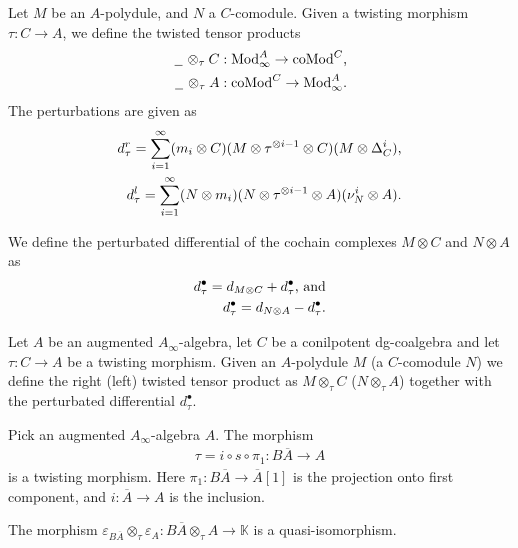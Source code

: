 \documentclass[../thesis.tex]{subfiles}
\begin{document}
            Let $M$ be an $A$-polydule, and $N$ a $C$-comodule. Given a twisting morphism $\tau : C \rightarrow A$, we define the twisted tensor products
            \begin{align*}
                \argument \otimes_\tau C & : \tt{Mod}_\infty^A \rightarrow \tt{coMod}^C\tt{,} \\
                \argument \otimes_\tau A & : \tt{coMod}^C \rightarrow \tt{Mod}_\infty^A\tt{.}
            \end{align*}
            The perturbations are given as
            \begin{align*}
                d_\tau^r = \sum_{i=1}^\infty (m_i \otimes C)(M \otimes \tau^{\otimes i-1} \otimes C)(M \otimes \Delta_C^i)\tt{,} \\
                d_\tau^l = \sum_{i=1}^\infty (N \otimes m_i) (N \otimes \tau^{\otimes i-1} \otimes A)(\nu_N^i \otimes A)\tt{.}
            \end{align*}

            We define the perturbated differential of the cochain complexes $M \otimes C$ and $N \otimes A$ as
            \begin{align*}
                d_\tau^\bullet = d_{M \otimes C} + d_\tau^\bullet\tt{, and} \\
                d_\tau^\bullet = d_{N \otimes A} - d_\tau^\bullet\tt{.}
            \end{align*}

            \begin{definition}
                Let $A$ be an augmented $A_\infty$-algebra, let $C$ be a conilpotent dg-coalgebra and let $\tau : C \rightarrow A$ be a twisting morphism. Given an $A$-polydule $M$ (a $C$-comodule $N$) we define the right (left) twisted tensor product as $M \otimes_{\tau} C$ ($N \otimes_\tau A$) together with the perturbated differential $d_\tau^\bullet$.
            \end{definition}

            Pick an augmented $A_\infty$-algebra $A$. The morphism
            \begin{align*}
                \tau = i \circ s\circ \pi_1 : B\overline{A} \rightarrow A
            \end{align*}
            is a twisting morphism. Here $\pi_1 : B\overline{A} \rightarrow \overline{A}[1]$ is the projection onto first component, and $i : \overline{A} \rightarrow A$ is the inclusion.

            \begin{lemma}\label{lem: twisting-acyclic-v.2}
                The morphism $\varepsilon_{B\overline{A}}\otimes_\tau \varepsilon_A : B\overline{A} \otimes_\tau A \rightarrow \mathbb{K}$ is a quasi-isomorphism.
            \end{lemma}
\end{document}
